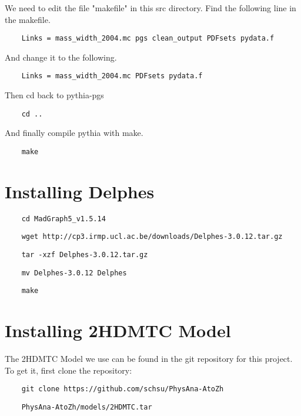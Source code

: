\documentclass{article}
\begin{document}
We need to edit the file "makefile" in this src directory. Find the following line in the makefile.

\begin{verbatim}
	Links = mass_width_2004.mc pgs clean_output PDFsets pydata.f
\end{verbatim}

And change it to the following.

\begin{verbatim}
	Links = mass_width_2004.mc PDFsets pydata.f
\end{verbatim}

Then cd back to pythia-pgs

\begin{verbatim}
	cd ..
\end{verbatim}

And finally compile pythia with make.

\begin{verbatim}
	make
\end{verbatim}

\section {Installing Delphes}

\begin{verbatim}
	cd MadGraph5_v1.5.14
\end{verbatim}

\begin{verbatim}
	wget http://cp3.irmp.ucl.ac.be/downloads/Delphes-3.0.12.tar.gz
\end{verbatim}

\begin{verbatim}
	tar -xzf Delphes-3.0.12.tar.gz
\end{verbatim}

\begin{verbatim}
	mv Delphes-3.0.12 Delphes
\end{verbatim}

\begin{verbatim}
	make
\end{verbatim}

\section {Installing 2HDMTC Model}

The 2HDMTC Model we use can be found in the git repository for this project. To get it, first clone the repository:

\begin{verbatim}
	git clone https://github.com/schsu/PhysAna-AtoZh
\end{verbatim}

\begin{verbatim}
	PhysAna-AtoZh/models/2HDMTC.tar
\end{verbatim}
\end{document}

